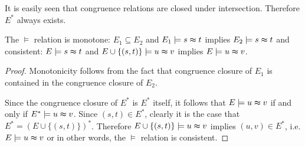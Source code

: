 It is easily seen that congruence relations are closed under intersection.
Therefore $E^*$ always exists.

\begin{proposition}
\label{prop:models}
The $\models$ relation is monotone: $E_1 \subseteq E_2$ and $E_1 \models s \thickapprox t$ implies $E_2 \models s \thickapprox t$ and consistent: $E \models s \thickapprox t$ and $E \cup \{(s,t)\} \models u \thickapprox v$ implies $E \models u \thickapprox v$. 

\end{proposition}

\begin{proof}

Monotonicity follows from the fact that congruence closure of $E_1$ is contained in the congruence closure of $E_2$.

Since the congruence closure of $E^*$ is $E^*$ itself, it follows that $E \models u \thickapprox v$ if and only if $E^* \models u \thickapprox v$.
Since $(s,t) \in E^*$, clearly it is the case that $E^* = (E \cup \{(s,t)\})^*$.
Therefore $E \cup \{(s,t)\} \models u \thickapprox v$ implies $(u,v) \in E^*$, i.e. $E \models u \thickapprox v$ or in other words, the $\models$ relation is consistent.

\end{proof}
